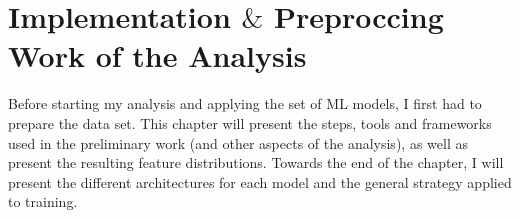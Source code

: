 \chapter{Implementation $\&$ Preproccing Work of the Analysis}\label{chap:Implementation}
Before starting my analysis and applying the set of \ac{ML} models, I first had to prepare the data set. This chapter 
will present the steps, tools and frameworks used in the preliminary work (and other aspects of the analysis), as well as present the 
resulting feature distributions. Towards the end of the chapter, I will present the different architectures for each model and the general 
strategy applied to training.

